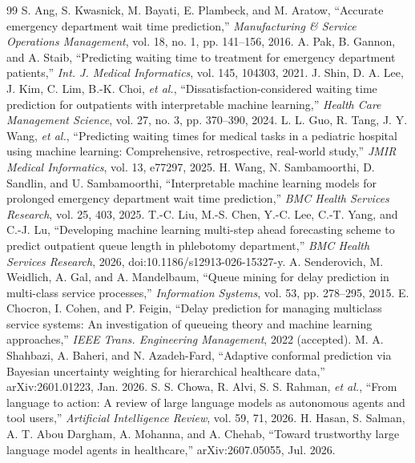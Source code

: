 \documentclass[11pt,twocolumn]{article}
\begin{document}
\balance
\linespread{1.0}\selectfont\begin{thebibliography}{99}\footnotesize\setlength{\itemsep}{2pt}
 S. Ang, S. Kwasnick, M. Bayati, E. Plambeck, and M. Aratow, ``Accurate emergency department wait time prediction,'' \textit{Manufacturing \& Service Operations Management}, vol. 18, no. 1, pp. 141--156, 2016.
 A. Pak, B. Gannon, and A. Staib, ``Predicting waiting time to treatment for emergency department patients,'' \textit{Int. J. Medical Informatics}, vol. 145, 104303, 2021.
 J. Shin, D. A. Lee, J. Kim, C. Lim, B.-K. Choi, \textit{et al.}, ``Dissatisfaction-considered waiting time prediction for outpatients with interpretable machine learning,'' \textit{Health Care Management Science}, vol. 27, no. 3, pp. 370--390, 2024.
 L. L. Guo, R. Tang, J. Y. Wang, \textit{et al.}, ``Predicting waiting times for medical tasks in a pediatric hospital using machine learning: Comprehensive, retrospective, real-world study,'' \textit{JMIR Medical Informatics}, vol. 13, e77297, 2025.
 H. Wang, N. Sambamoorthi, D. Sandlin, and U. Sambamoorthi, ``Interpretable machine learning models for prolonged emergency department wait time prediction,'' \textit{BMC Health Services Research}, vol. 25, 403, 2025.
 T.-C. Liu, M.-S. Chen, Y.-C. Lee, C.-T. Yang, and C.-J. Lu, ``Developing machine learning multi-step ahead forecasting scheme to predict outpatient queue length in phlebotomy department,'' \textit{BMC Health Services Research}, 2026, doi:10.1186/s12913-026-15327-y.
 A. Senderovich, M. Weidlich, A. Gal, and A. Mandelbaum, ``Queue mining for delay prediction in multi-class service processes,'' \textit{Information Systems}, vol. 53, pp. 278--295, 2015.
 E. Chocron, I. Cohen, and P. Feigin, ``Delay prediction for managing multiclass service systems: An investigation of queueing theory and machine learning approaches,'' \textit{IEEE Trans. Engineering Management}, 2022 (accepted).
 M. A. Shahbazi, A. Baheri, and N. Azadeh-Fard, ``Adaptive conformal prediction via Bayesian uncertainty weighting for hierarchical healthcare data,'' arXiv:2601.01223, Jan. 2026.
 S. S. Chowa, R. Alvi, S. S. Rahman, \textit{et al.}, ``From language to action: A review of large language models as autonomous agents and tool users,'' \textit{Artificial Intelligence Review}, vol. 59, 71, 2026.
 H. Hasan, S. Salman, A. T. Abou Dargham, A. Mohanna, and A. Chehab, ``Toward trustworthy large language model agents in healthcare,'' arXiv:2607.05055, Jul. 2026.

\end{thebibliography}
\end{document}
